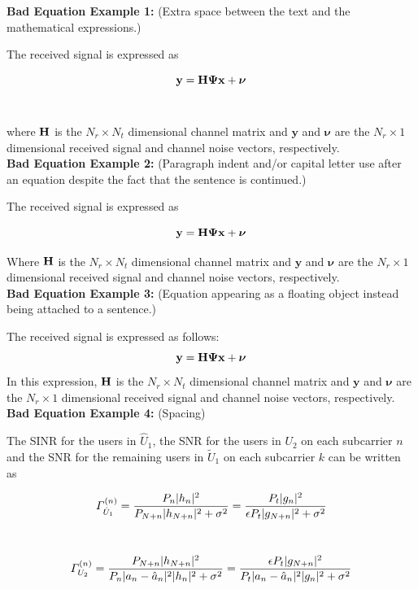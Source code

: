 \documentclass[a4paper,oneside,12pt]{report}
\newcommand{\beq}{\begin{equation} \setlength\abovedisplayskip{5pt} 
\setlength\belowdisplayskip{5pt}}
\newcommand{\eeq}{\end{equation}}
\numberwithin{equation}{chapter}
\begin{document}
{ \textbf{Bad Equation Example 1:} (Extra space between the text and the mathematical expressions.)}

The received signal is expressed as\

\beq
{\mathbf y}={\mathbf H}{\bf \Psi}{\mathbf x} + {\bm{\nu}} 
\eeq\

 where ${\bf H}$ is the $N_r \times N_t$ dimensional channel matrix and ${\mathbf y}$ and ${\bm{\nu}} $ are the $N_r \times 1$ dimensional received signal and channel noise vectors, respectively. \\
 
{\textbf{ Bad Equation Example 2:} (Paragraph indent and/or capital letter use after an equation despite the fact that the sentence is continued.)}

The received signal is expressed as

\beq
{\mathbf y}={\mathbf H}{\bf \Psi}{\mathbf x} + {\bm{\nu}} 
\eeq

\hspace{.2in} Where ${\bf H}$ is the $N_r \times N_t$ dimensional channel matrix and ${\mathbf y}$ and ${\bm{\nu}} $ are the $N_r \times 1$ dimensional received signal and channel noise vectors, respectively. \\

{ \textbf{Bad Equation Example 3:} (Equation appearing as a floating object instead being attached to a sentence.)}

The received signal is expressed as follows:
\beq
{\mathbf y}={\mathbf H}{\bf \Psi}{\mathbf x} + {\bm{\nu}} 
\eeq In this expression, ${\bf H}$ is the $N_r \times N_t$ dimensional channel matrix and ${\mathbf y}$ and ${\bm{\nu}} $ are the $N_r \times 1$ dimensional received signal and channel noise vectors, respectively. \\


{ \textbf{Bad Equation Example 4:} (Spacing) }

The SINR for the users in $\hat{U}_1$, the SNR for the users in $U_2$ on each subcarrier $n$ and the SNR for the remaining users in $\tilde{U}_1$ on each subcarrier $k$ can be written as\

\beq
\Gamma^{(n)}_{\hat{U}_1} = \frac{P_n |h_n|^2}{P_{N+n} |h_{N+n}|^2 + \sigma^2} = \frac{P_t |g_n|^2}{\epsilon P_t |g_{N+n}|^2 + \sigma^2}\eeq\

\beq \Gamma^{(n)}_{U_2} = \frac{P_{N+n} |h_{N+n}|^2}{P_n |a_n - \hat{a}_n|^2 |h_n|^2 + \sigma^2} = \frac{\epsilon P_t |g_{N+n}|^2}{P_t |a_n - \hat{a}_n|^2 |g_{n}|^2 + \sigma^2} \eeq\
\end{document}
